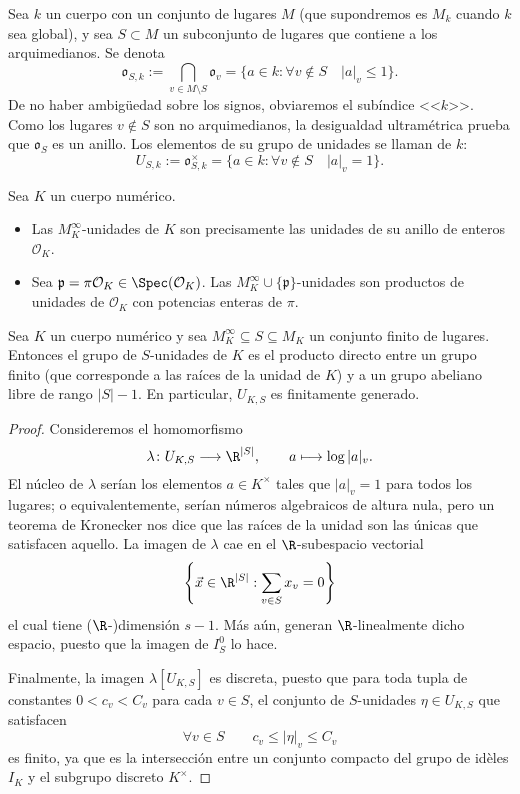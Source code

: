 \documentclass[teoria-numeros.tex]{subfiles}
\begin{document}
\begin{mydef}
	Sea $k$ un cuerpo con un conjunto de lugares $M$ (que supondremos es $M_k$ cuando $k$ sea global),
	y sea $S \subset M$ un subconjunto de lugares que contiene a los arquimedianos.
	Se denota
	\[
		\mathfrak{o}_{S, k} := \bigcap_{v \in M \setminus S} \mathfrak{o}_v = \{ a \in k : \forall v \notin S \quad |a|_v \le 1 \}.
	\]
	De no haber ambigüedad sobre los signos, obviaremos el subíndice <<$k$>>.
	Como los lugares $v \notin S$ son no arquimedianos, la desigualdad ultramétrica prueba que $\mathfrak{o}_S$ es un anillo.
	Los elementos de su grupo de unidades se llaman  de $k$:
	$$ U_{S, k} := \mathfrak{o}_{S, k}^\times = \{ a \in k : \forall v \notin S \quad |a|_v = 1 \}. $$
\end{mydef}
\begin{ex}
	Sea $K$ un cuerpo numérico.
	\begin{itemize}
		\item Las $M_K^\infty$-unidades de $K$ son precisamente las unidades de su anillo de enteros $\mathcal{O}_K$.
		\item Sea $\mathfrak{p} = \pi\mathcal{O}_K \in \Spec(\mathcal{O}_K)$.
			Las $M_K^\infty \cup \{ \mathfrak{p} \}$-unidades son productos de unidades de $\mathcal{O}_K$ con potencias enteras de $\pi$.
	\end{itemize}
\end{ex}

\begin{thmi}
	Sea $K$ un cuerpo numérico y sea $M_K^\infty \subseteq S \subseteq M_K$ un conjunto finito de lugares.
	Entonces el grupo de $S$-unidades de $K$ es el producto directo entre un grupo finito (que corresponde a las raíces de la unidad de $K$)
	y a un grupo abeliano libre de rango $|S| - 1$.
	En particular, $U_{K, S}$ es finitamente generado.
\end{thmi}
\begin{proof}
	Consideremos el homomorfismo
	$$ \lambda\colon U_{K, S} \longrightarrow \R^{|S|}, \qquad a \longmapsto \log|a|_v. $$
	El núcleo de $\lambda$ serían los elementos $a \in K^\times$ tales que $|a|_v = 1$ para todos los lugares;
	o equivalentemente, serían números algebraicos de altura nula, pero un teorema de Kronecker nos dice que las raíces de la unidad son las únicas
	que satisfacen aquello.
	La imagen de $\lambda$ cae en el $\R$-subespacio vectorial
	$$ \left\{ \vec x \in \R^{|S|} : \sum_{v\in S} x_v = 0 \right\} $$
	el cual tiene ($\R$-)dimensión $s - 1$.
	Más aún, generan $\R$-linealmente dicho espacio, puesto que la imagen de $I_S^0$ lo hace.

	Finalmente, la imagen $\lambda[U_{K, S}]$ es discreta, puesto que para toda tupla de constantes $0 < c_v < C_v$ para cada $v \in S$, el conjunto
	de $S$-unidades $\eta \in U_{K, S}$ que satisfacen
	$$ \forall v \in S \qquad c_v \le |\eta|_v \le C_v $$
	es finito, ya que es la intersección entre un conjunto compacto del grupo de idèles $I_K$ y el subgrupo discreto $K^\times$.
\end{proof}
\end{document}
